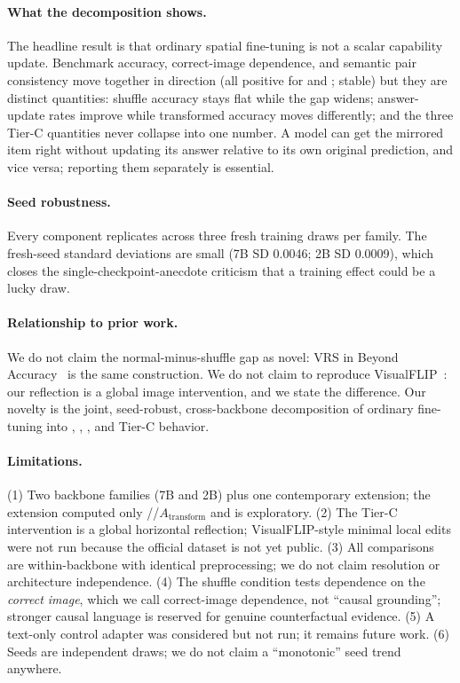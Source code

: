 \paragraph{What the decomposition shows.}
The headline result is that ordinary spatial fine-tuning is not a scalar
capability update. Benchmark accuracy, correct-image dependence, and
semantic pair consistency move together in direction (all positive for
\dA{} and \dG{}; \dC{} stable) but they are distinct quantities: shuffle
accuracy stays flat while the gap widens; answer-update rates improve
while transformed accuracy moves differently; and the three Tier-C
quantities never collapse into one number. A model can get the mirrored
item right without updating its answer relative to its own original
prediction, and vice versa; reporting them separately is essential.

\paragraph{Seed robustness.}
Every component replicates across three fresh training draws per family.
The fresh-seed standard deviations are small (7B \dA{} SD 0.0046; 2B \dA{}
SD 0.0009), which closes the single-checkpoint-anecdote criticism that a
training effect could be a lucky draw.

\paragraph{Relationship to prior work.}
We do not claim the normal-minus-shuffle gap as novel: VRS in Beyond
Accuracy~\cite{zafar2026beyond} is the same construction. We do not claim
to reproduce VisualFLIP~\cite{zhu2026visualflip}: our reflection is a
global image intervention, and we state the difference. Our novelty is the
joint, seed-robust, cross-backbone decomposition of ordinary fine-tuning
into \dA{}, \dG{}, \dC{}, and Tier-C behavior.

\paragraph{Limitations.}
(1) Two backbone families (7B and 2B) plus one contemporary extension; the
extension computed only \dA{}/\dG{}/$A_{\text{transform}}$ and is
exploratory. (2) The Tier-C intervention is a global horizontal
reflection; VisualFLIP-style minimal local edits were not run because the
official dataset is not yet public. (3) All comparisons are within-backbone
with identical preprocessing; we do not claim resolution or
architecture independence. (4) The shuffle condition tests dependence on
the \emph{correct image}, which we call correct-image dependence, not
``causal grounding''; stronger causal language is reserved for genuine
counterfactual evidence. (5) A text-only control adapter was considered
but not run; it remains future work. (6) Seeds are independent draws; we
do not claim a ``monotonic'' seed trend anywhere.
